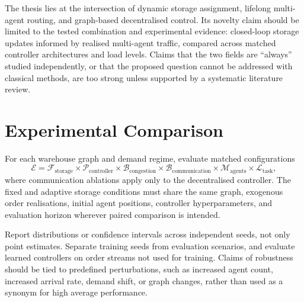 \documentclass[../main.tex]{subfiles}
\begin{document}
The thesis lies at the intersection of dynamic storage assignment, lifelong
multi-agent routing, and graph-based decentralised control. Its novelty claim
should be limited to the tested combination and experimental evidence:
closed-loop storage updates informed by realised multi-agent traffic, compared
across matched controller architectures and load levels. Claims that the two
fields are ``always'' studied independently, or that the proposed question
cannot be addressed with classical methods, are too strong unless supported by
a systematic literature review.

\section{Experimental Comparison}
\label{sec:experimental-comparison}

For each warehouse graph and demand regime, evaluate matched configurations
\[
\mathcal{E}=
\mathcal{F}_{\mathrm{storage}}
\times
\mathcal{P}_{\mathrm{controller}}
\times
\mathcal{B}_{\mathrm{congestion}}
\times
\mathcal{B}_{\mathrm{communication}}
\times
\mathcal{M}_{\mathrm{agents}}
\times
\mathcal{L}_{\mathrm{task}},
\]
where communication ablations apply only to the decentralised controller. The
fixed and adaptive storage conditions must share the same graph, exogenous
order realisations, initial agent positions, controller hyperparameters, and
evaluation horizon wherever paired comparison is intended.

Report distributions or confidence intervals across independent seeds, not
only point estimates. Separate training seeds from evaluation scenarios, and
evaluate learned controllers on order streams not used for training. Claims of
robustness should be tied to predefined perturbations, such as increased agent
count, increased arrival rate, demand shift, or graph changes, rather than used
as a synonym for high average performance.
\end{document}
